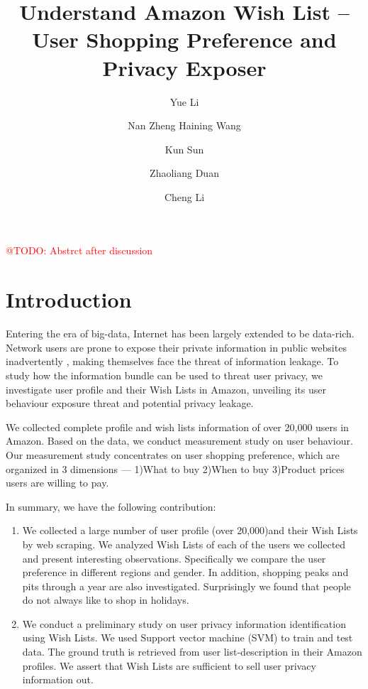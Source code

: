 \documentclass{llncs}
\makeatletter
\newcommand{\todo}[1]{\textcolor{red}{@TODO: #1}}
\makeatother
\begin{document}
\pagestyle{plain}
\title{Understand Amazon Wish List -- User Shopping Preference and Privacy Exposer}
%
%
\author{Yue Li \and Nan Zheng
Haining Wang \and Kun Sun\and Zhaoliang Duan \and Cheng Li}
%
%
%
\maketitle              %

\todo{Abstrct after discussion}
\begin{abstract}

\end{abstract}


\section{Introduction}
Entering the era of big-data, Internet has been largely extended to be data-rich. Network users are prone to expose their private information in public websites inadvertently \cite{frankowski2006you}, making themselves face the threat of information leakage. To study how the information bundle can be used to threat user privacy, we investigate user profile and their Wish Lists in Amazon, unveiling its user behaviour exposure threat and potential privacy leakage. 

We collected complete profile and wish lists information of over 20,000 users in Amazon. Based on the data, we conduct measurement study on user behaviour. Our measurement study concentrates on user shopping preference, which are organized in 3 dimensions — 1)What to buy 2)When to buy 3)Product prices users are willing to pay. 

In summary, we have the following contribution:
\begin{enumerate}
\item  We collected a large number of user profile (over 20,000)and their Wish Lists by web scraping. We analyzed Wish Lists of each of the users we collected and present interesting observations. Specifically we compare the user preference in different regions and gender. In addition, shopping peaks and pits through a year are also investigated. Surprisingly we found that people do not always like to shop in holidays.
\item We conduct a preliminary study on user privacy information identification using Wish Lists. We used Support vector machine (SVM) to train and test data. The ground truth is retrieved from user list-description in their Amazon profiles. We assert that Wish Lists are sufficient to sell user privacy information out.
\end{enumerate}
\end{document}
